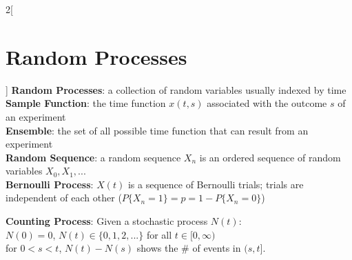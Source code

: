\documentclass{article}
\begin{document}
	\begin{multicols}{2}[\section*{Random Processes}]
	\textbf{Random Processes}: a collection of random variables usually indexed by time\\
	\textbf{Sample Function}: the time function  $x(t, s)$ associated with the outcome $s$ of an experiment\\
	\textbf{Ensemble}: the set of all possible time function that can result from an experiment\\
	\textbf{Random Sequence}: a random sequence $X_n$ is an ordered sequence of random variables $X_0, X_1, ...$\\
    
	\textbf{Bernoulli Process}: $X(t)$ is a sequence of Bernoulli trials; trials are independent of each other ($P\{X_n = 1\} = p = 1 - P\{X_n = 0\}$)
	
	\textbf{Counting Process}: Given a stochastic process $N(t)$:\\
    $N(0) = 0$, $N(t) \in \{0, 1, 2,...\}$ for all $t \in [0, \infty)$\\
    for $0 < s < t$, $N(t) - N(s)$ shows the \# of events in $(s,t]$.\\
    \end{multicols}
    
\end{document}

